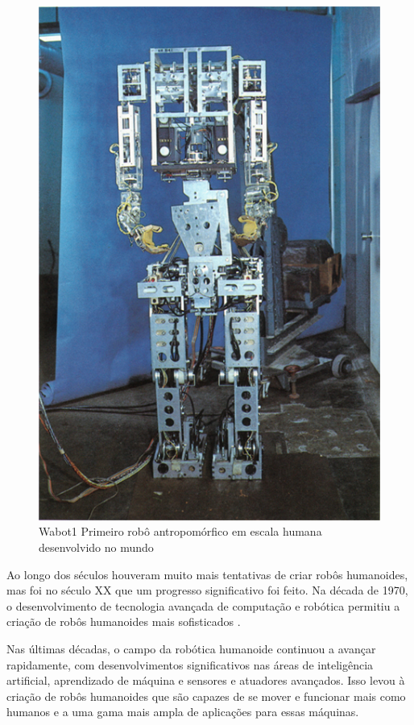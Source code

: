 \documentclass{report}
\begin{document}
\begin{figure}
\includegraphics[width=0.9\linewidth]{wabot.png} 
\caption{Wabot1 Primeiro robô antropomórfico em escala humana desenvolvido no mundo}
\label{wabot}
\end{figure}


Ao longo dos séculos houveram muito mais tentativas de criar robôs humanoides, mas foi no século XX que um progresso significativo foi feito. Na década de 1970, o desenvolvimento de tecnologia avançada de computação e robótica permitiu a criação de robôs humanoides mais sofisticados \cite{wabot}.

Nas últimas décadas, o campo da robótica humanoide continuou a avançar rapidamente, com desenvolvimentos significativos nas áreas de inteligência artificial, aprendizado de máquina e sensores e atuadores avançados. Isso levou à criação de robôs humanoides que são capazes de se mover e funcionar mais como humanos e a uma gama mais ampla de aplicações para essas máquinas.
\end{document}
